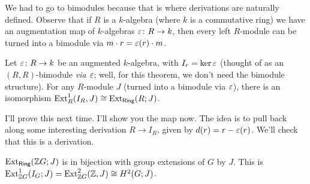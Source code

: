 \begin{remark}
 We had to go to bimodules because that is where derivations are naturally defined. Observe that if $R$ is a $k$-algebra (where $k$ is a commutative ring) we have an augmentation map of $k$-algebras $\varepsilon\colon R\to k$, then every left $R$-module can be turned into a bimodule via $m\cdot r = \varepsilon(r)\cdot m$.
\end{remark}
\begin{theorem}
 Let $\varepsilon\colon R\to k$ be an augmented $k$-algebra, with $I_r=\ker \varepsilon$ (thought of as an $(R,R)$-bimodule \emph{via $\varepsilon$}; well, for this theorem, we don't need the bimodule structure). For any $R$-module $J$ (turned into a bimodule via $\varepsilon$), there is an isomorphism $\operatorname{Ext}^1_R(I_R,J)\cong \operatorname{Ext}_{\text{\sf Ring}} (R;J)$.
\end{theorem}
I'll prove this next time. I'll show you the map now. The idea is to pull back along some interesting derivation $R\to I_R$, given by $d(r)=r-\varepsilon(r)$. We'll check that this is a derivation.
\begin{theorem}
 $\operatorname{Ext}_{\text{\sf Ring}}(\mathbb{Z} G; J)$ is in bijection with group extensions of $G$ by $J$. This is $\operatorname{Ext}^1_{\mathbb{Z} G}(I_G;J)=\operatorname{Ext}^2_{\mathbb{Z} G}(\mathbb{Z}, J)\cong H^2(G;J)$.
\end{theorem}


